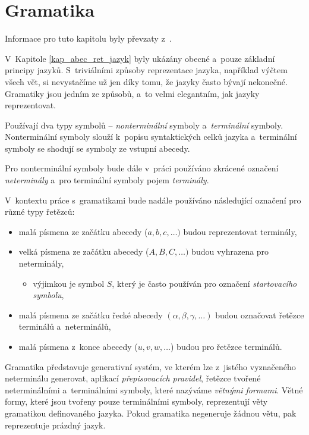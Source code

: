 \section{Gramatika}

Informace pro tuto kapitolu byly převzaty z~\cite{TIN-opora}.

V~Kapitole \ref{kap_abec_ret_jazyk} byly ukázány obecné a~pouze základní principy jazyků.
S~triviálními způsoby reprezentace jazyka, například výčtem všech vět, si nevystačíme už jen díky tomu, že jazyky často bývají nekonečné.
Gramatiky jsou jedním ze způsobů, a~to velmi elegantním, jak jazyky reprezentovat.

Používají dva typy symbolů -- \emph{nonterminální} symboly a~\emph{terminální} symboly.
Nonterminální symboly slouží k~popisu syntaktických celků jazyka a~terminální symboly se shodují se symboly ze vstupní abecedy.

\begin{convention}
    Pro nonterminální symboly bude dále v~práci používáno zkrácené označení \emph{neterminály} a~pro terminální symboly pojem \emph{terminály}.
\end{convention}

\begin{convention}\label{conv_oznaceni_symbolu}
    V~kontextu práce s~gramatikami bude nadále používáno následující označení pro různé typy řetězců:
    \begin{itemize}
        \item malá písmena ze začátku abecedy ($a, b, c,\ldots)$ budou reprezentovat terminály,
        \item velká písmena ze začátku abecedy ($A, B, C,\ldots)$ budou vyhrazena pro neterminály,
        \begin{itemize}[label=$\circ$]
            \item výjimkou je symbol $S$, který je často používán pro označení \emph{startovacího symbolu},
        \end{itemize}
        \item malá písmena ze začátku řecké abecedy $(\alpha, \beta, \gamma,\ldots)$ budou označovat řetězce terminálů a~neterminálů,
        \item malá písmena z~konce abecedy ($u, v, w,\ldots$) budou pro řetězce terminálů.
    \end{itemize}
\end{convention}

Gramatika představuje generativní systém, ve kterém lze z~jistého vyznačeného neterminálu generovat, aplikací \emph{přepisovacích pravidel}, řetězce tvořené neterminálními a~terminálními symboly, které nazýváme \emph{větnými formami}. 
Větné formy, které jsou tvořeny pouze terminálními symboly, reprezentují věty gramatikou definovaného jazyka.
Pokud gramatika negeneruje žádnou větu, pak reprezentuje prázdný jazyk.

